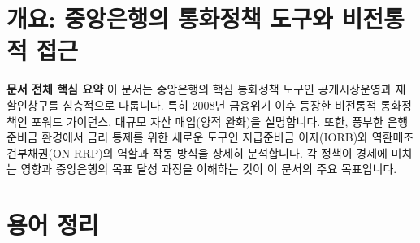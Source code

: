 \documentclass[11pt,a4paper]{article}
\begin{document}
\newpage

\newpage
\section*{개요: 중앙은행의 통화정책 도구와 비전통적 접근}

\begin{summarybox}
  \textbf{문서 전체 핵심 요약}
  이 문서는 중앙은행의 핵심 통화정책 도구인 공개시장운영과 재할인창구를 심층적으로 다룹니다.
  특히 2008년 금융위기 이후 등장한 비전통적 통화정책인 포워드 가이던스, 대규모 자산 매입(양적 완화)을 설명합니다.
  또한, 풍부한 은행 준비금 환경에서 금리 통제를 위한 새로운 도구인 지급준비금 이자(IORB)와 역환매조건부채권(ON RRP)의 역할과 작동 방식을 상세히 분석합니다.
  각 정책이 경제에 미치는 영향과 중앙은행의 목표 달성 과정을 이해하는 것이 이 문서의 주요 목표입니다.
\end{summarybox}

\newpage
\section*{용어 정리}
\end{document}
